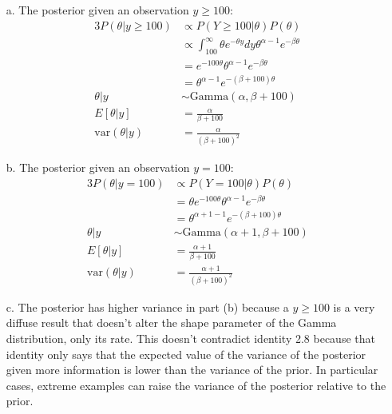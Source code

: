 \documentclass[10pt]{article}
\begin{document}
\begin{enumerate}
\item[a.] The posterior given an observation $y \geq 100$:
\begin{alignat*}{3}
P(\theta | y\geq 100) &\propto P(Y \geq 100 | \theta)P(\theta) \\
& \propto \int_{100}^\infty \theta e^{-\theta y} dy \theta^{\alpha -1}e^{-\beta \theta} \\
& = e^{-100\theta}\theta^{\alpha-1}e^{-\beta \theta} \\
& = \theta^{\alpha -1}e^{-(\beta+100)\theta} \\
\theta | y & \sim \text{Gamma}(\alpha, \beta + 100) \\
E[\theta | y] &= \frac{\alpha}{\beta + 100} \\
\text{var}(\theta | y) &= \frac{\alpha}{(\beta + 100)^2}
\end{alignat*}
\item[b.] The posterior given an observation $y = 100$:
\begin{alignat*}{3}
P(\theta | y = 100) &\propto P(Y = 100 | \theta)P(\theta) \\
& = \theta e^{-100\theta}\theta^{\alpha-1}e^{-\beta \theta} \\
& = \theta^{\alpha +1-1}e^{-(\beta+100)\theta} \\
\theta | y & \sim \text{Gamma}(\alpha + 1, \beta + 100) \\
E[\theta | y] &= \frac{\alpha + 1}{\beta + 100} \\
\text{var}(\theta | y) &= \frac{\alpha + 1}{(\beta + 100)^2}
\end{alignat*}
\item[c.] The posterior has higher variance in part (b) because a $y \geq 100$ is a very diffuse result that doesn't alter the shape parameter of the Gamma distribution, only its rate. This doesn't contradict identity 2.8 because that identity only says that the expected value of the variance of the posterior given more information is lower than the variance of the prior. In particular cases, extreme examples can raise the variance of the posterior relative to the prior.
\end{enumerate}
\end{document}
